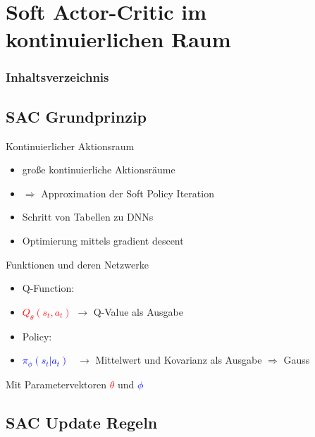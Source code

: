 \section{Soft Actor-Critic im kontinuierlichen Raum}
\begin{frame}
    \frametitle{Inhaltsverzeichnis}
    \tableofcontents[currentsection]
\end{frame}
\subsection{SAC Grundprinzip}

\begin{frame}{Kontinuierlicher Aktionsraum}
\begin{itemize}
\item große kontinuierliche Aktionsräume
\item[] $\Rightarrow$ Approximation der Soft Policy Iteration \\[12pt]
\item Schritt von Tabellen zu DNNs
\item Optimierung mittels gradient descent
\end{itemize}
\end{frame}

\begin{frame}{Funktionen und deren Netzwerke}
\begin{itemize}
\item Q-Function:
\item[] \textcolor{red}{$Q_{\theta}(s_{t},a_{t})$}	$\rightarrow$ Q-Value als Ausgabe \\[6pt]
\item Policy:
\item[] \textcolor{blue}{$\pi_{\phi}(s_{t}|a_{t})$} \,	$\rightarrow$ Mittelwert und Kovarianz als Ausgabe $\Rightarrow$ Gauss \\[12pt]
\end{itemize}
Mit Parametervektoren \textcolor{red}{$\theta$} und \textcolor{blue}{$\phi$}
\end{frame}

\subsection{SAC Update Regeln}


